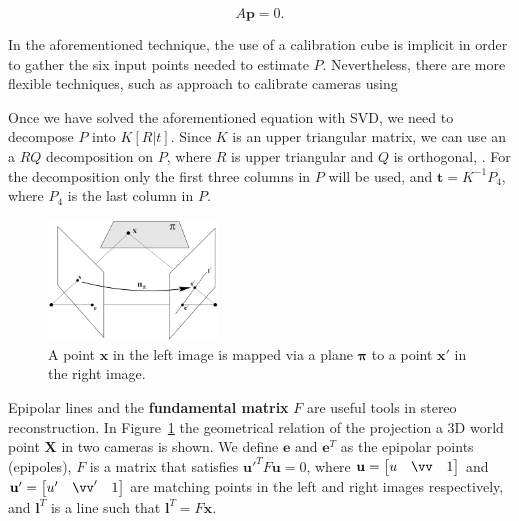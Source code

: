 \documentclass[12pt]{article}
\begin{document}
\begin{equation}
A\mathbf{p} = 0.
\end{equation}

In the aforementioned technique, the use of a calibration cube is implicit in order to gather the six input points needed to estimate $P$.
Nevertheless, there are more flexible techniques, such as \cite{Zhang2000} approach to calibrate cameras using 

Once we have solved the aforementioned equation with SVD, we need to decompose $P$ into $K[R|t]$.
Since $K$ is an upper triangular matrix, we can use an a $RQ$ decomposition on $P$, where $R$ is upper triangular and $Q$ is orthogonal, \cite{Francis1961}.
For the decomposition only the first three columns in $P$ will be used, and $\mathbf{t} = K^{-1}P_4$, where $P_4$ is the last column in $P$.


\begin{figure}[htbp!]
	\centering
	\includegraphics[width=0.4\textwidth]{images/epipolarLines}
	\caption{A point $\mathbf{x}$ in the left image is mapped via a plane $\boldsymbol{\pi}$ to a point $\mathbf{x}'$ in the right image.}\label{fig:epipolarLines}
\end{figure}

Epipolar lines and the \textbf{fundamental matrix} $F$ are useful tools in stereo reconstruction.
In Figure~\ref{fig:epipolarLines} the geometrical relation of the projection a 3D world point $\mathbf{X}$ in two cameras is shown.
We define $\mathbf{e}$ and $\mathbf{e}^T$ as the epipolar points (epipoles), $F$ is a matrix that satisfies $\mathbf{u}'^TF\mathbf{u} = 0$, where $\mathbf{u} = \begin{bmatrix} u & \vv & 1 \end{bmatrix}$ and $\mathbf{u}' = \begin{bmatrix} u' & \vv' & 1 \end{bmatrix}$ are matching points in the left and right images respectively, and $\mathbf{l}^T$ is a line such that $\mathbf{l}^T = F\mathbf{x}$.
\end{document}
